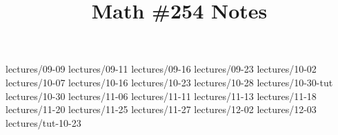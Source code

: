 \documentclass{scrartcl}
\title{Math \#254 Notes}
\begin{document}
\maketitle

\clearpage
\tableofcontents



{lectures/09-09}
{lectures/09-11}
{lectures/09-16}
{lectures/09-23}
{lectures/10-02}
{lectures/10-07}
{lectures/10-16}
{lectures/10-23}
{lectures/10-28}
{lectures/10-30-tut}
{lectures/10-30}
{lectures/11-06}
{lectures/11-11}
{lectures/11-13}
{lectures/11-18}
{lectures/11-20}
{lectures/11-25}
{lectures/11-27}
{lectures/12-02}
{lectures/12-03}
{lectures/tut-10-23}
\end{document}
